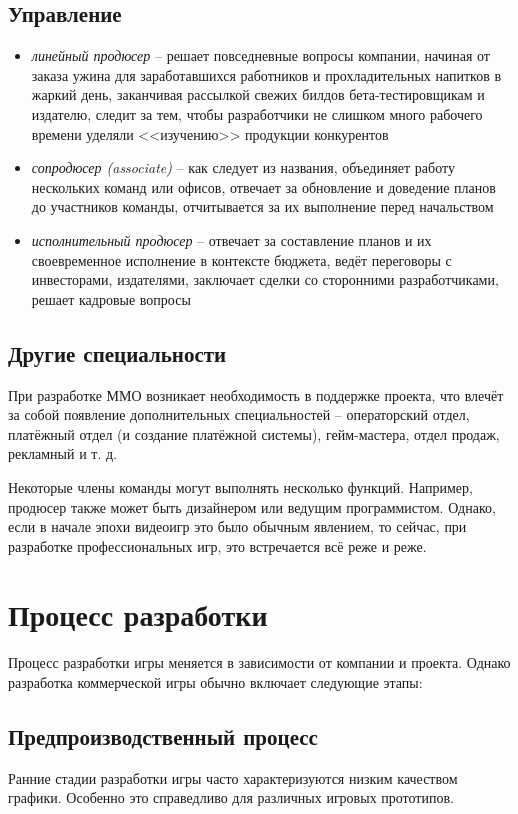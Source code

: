 \section{Управление}
\begin{itemize}
    \item \emph{линейный продюсер} -- решает повседневные вопросы компании, начиная от заказа ужина для
        заработавшихся работников и прохладительных напитков в жаркий день, заканчивая рассылкой свежих
        билдов бета-тестировщикам и издателю, следит за тем, чтобы разработчики не слишком много рабочего
        времени уделяли <<изучению>> продукции конкурентов
    \item \emph{сопродюсер (associate)} -- как следует из названия, объединяет работу нескольких команд
        или офисов, отвечает за обновление и доведение планов до участников команды, отчитывается за их
        выполнение перед начальством
    \item \emph{исполнительный продюсер} -- отвечает за составление планов и их своевременное исполнение в
        контексте бюджета, ведёт переговоры с инвесторами, издателями, заключает сделки со сторонними
        разработчиками, решает кадровые вопросы
\end{itemize}

\section{Другие специальности}
При разработке ММО возникает необходимость в поддержке проекта, что влечёт за собой появление дополнительных
специальностей -- операторский отдел, платёжный отдел (и создание платёжной системы), гейм-мастера, отдел
продаж, рекламный и т. д.

Некоторые члены команды могут выполнять несколько функций. Например, продюсер также может быть дизайнером
или ведущим программистом. Однако, если в начале эпохи видеоигр это было обычным явлением, то сейчас, при
разработке профессиональных игр, это встречается всё реже и реже.

\chapter{Процесс разработки}
Процесс разработки игры меняется в зависимости от компании и проекта. Однако разработка коммерческой игры
обычно включает следующие этапы:

\section{Предпроизводственный процесс}
Ранние стадии разработки игры часто характеризуются низким качеством графики. Особенно это справедливо для
различных игровых прототипов.

